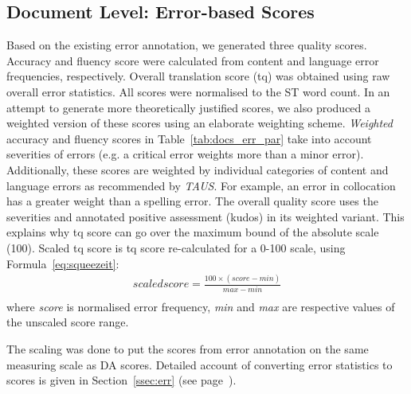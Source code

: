\subsection{\label{ssec:doc_err_res}Document Level: Error-based Scores}
Based on the existing error annotation, we generated three quality scores. Accuracy and fluency score were calculated from content and language error frequencies, respectively. Overall translation score (tq) was obtained using raw overall error statistics. All scores were normalised to the ST word count.
In an attempt to generate more theoretically justified scores, we also produced a weighted version of these scores using an elaborate weighting scheme. \textit{Weighted} accuracy and fluency scores in Table~\ref{tab:docs_err_par} take into account severities of errors (e.g. a critical error weights more than a minor error). Additionally, these scores are weighted by individual categories of content and language errors as recommended by \textit{TAUS}. For example, an error in collocation has a greater weight than a spelling error. 
The overall quality score uses the severities and annotated positive assessment (kudos) in its weighted variant. This explains why tq score can go over the maximum bound of the absolute scale (100). Scaled tq score is tq score re-calculated for a 0-100 scale, using Formula~\ref{eq:squeezeit}:
\begin{equation}\label{eq:squeezeit}
\begin{split}
scaled score = \frac{100\times (score - min)}{max - min} \\
\end{split}
\end{equation}
where \textit{score} is normalised error frequency, \textit{min} and \textit{max} are respective values of the unscaled score range.

The scaling was done to put the scores from error annotation on the same measuring scale as DA scores. Detailed account of converting error statistics to scores is given in Section~\ref{ssec:err} (see page~\pageref{pg:err-score-generation}). 

